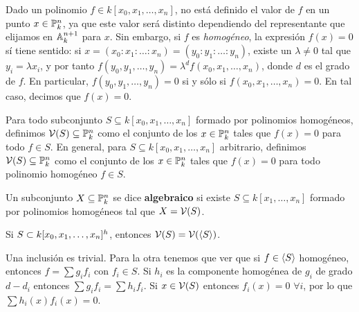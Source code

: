 \documentclass[ACGA.tex]{subfiles}
\begin{document}
Dado un polinomio $f\in k[x_0,x_1,\ldots,x_n]$, no está definido el valor de $f$ en un punto $x\in\mathbb{P}^n_k$, ya que este valor será distinto dependiendo del representante que elijamos en $\mathbb{A}^{n+1}_k$ para $x$. Sin embargo, si $f$ es \emph{homogéneo}, la expresión $f(x)=0$ sí tiene sentido: si $x=(x_0:x_1:\ldots:x_n)=(y_0:y_1:\ldots:y_n)$, existe un $\lambda\neq 0$ tal que $y_i=\lambda x_i$, y por tanto $f(y_0,y_1,\ldots,y_n)=\lambda^df(x_0,x_1,\ldots,x_n)$, donde $d$ es el grado de $f$. En particular, $f(y_0,y_1,\ldots,y_n)=0$ si y sólo si $f(x_0,x_1,\ldots,x_n)=0$. En tal caso, decimos que $f(x)=0$.

Para todo subconjunto $S\subseteq k[x_0,x_1,\ldots,x_n]$ formado por polinomios homogéneos, definimos $\mathcal{V}(S)\subseteq \mathbb{P}^n_k$ como el conjunto de los $x\in\mathbb{P}^n_k$ tales que $f(x)=0$ para todo $f\in S$. En general, para $S\subseteq k[x_0,x_1,\ldots,x_n]$ arbitrario, definimos $\mathcal{V}(S)\subseteq \mathbb{P}^n_k$ como el conjunto de los $x\in\mathbb{P}^n_k$ tales que $f(x)=0$ para todo polinomio homogéneo $f\in S$. 

\begin{defi}
 Un subconjunto $X\subseteq\mathbb{P}^n_k$ se dice {\bf algebraico} si existe $S\subseteq k[x_1,\ldots,x_n]$ formado por polinomios homogéneos tal que $X=\mathcal{V}(S)$.
\end{defi}

\begin{prop}
Si $S\subset k[x_0,x_1,\dotsc,x_{n}]^h$, entonces $\mathcal{V}(S)=\mathcal{V}(\langle{S}\rangle)$. 
\end{prop}
\begin{dem}
Una inclusión es trivial. Para la otra tenemos que ver que si $f\in \langle{S}\rangle$ homogéneo, entonces $f=\sum g_i f_i$ con $f_i \in S$. Si $h_i$ es la componente homogénea de $g_i$ de grado $d-d_i$ entonces $\sum g_i f_i = \sum h_i f_i$. Si $x\in \mathcal{V}(S)$ entonces $f_i(x)=0$ $\forall i$, por lo que $\sum h_i (x) f_i (x) =0$. 
\end{dem}

\end{document}
